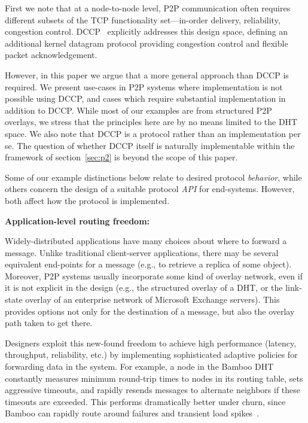 \documentclass[10pt,twocolumn]{article}
\renewcommand{\subsection}[1]{\vspace{10pt}\noindent\textbf{#1:}\vspace{5pt}}
\begin{document}
First we note that at a node-to-node level, P2P
communication often requires different subsets of the TCP
functionality set---in-order delivery, reliability, congestion
control. 
DCCP~\cite{dccp-problem} explicitly addresses this design space,
defining an additional kernel datagram protocol providing
congestion control and flexible packet acknowledgement. 

However, in this paper we argue that a more general approach than DCCP
is required.  We present use-cases in P2P systems where
implementation is not possible using DCCP, and cases which
require substantial implementation in addition to DCCP.   While most
of our examples are from structured P2P overlays, we stress that the
principles here are by no means limited to the DHT space. 
We also note that DCCP is a protocol rather than an
implementation per se.  The question of whether DCCP itself is
naturally implementable within the framework of section~\ref{sec:p2}
is beyond the scope of this paper.

Some of our example distinctions below relate to desired protocol
\emph{behavior}, while others concern the design of a suitable protocol
\emph{API} for end-systems.  However, both affect how the protocol is implemented.

\subsection{Application-level routing freedom}
\label{sec:routingFreedom}

Widely-distributed applications have many choices about
where to forward a message.  Unlike traditional client-server
applications, there may be several equivalent end-points for a message 
(e.g., to retrieve a replica of some object).  
Moreover, P2P systems usually incorporate some kind of overlay
network, even if it is not explicit in the
design (e.g., the structured overlay of a DHT, or the
link-state overlay of an enterprise network of Microsoft
Exchange servers).  This provides options not only for the
destination of a message, but also the overlay path taken to get
there.

Designers exploit this new-found freedom to achieve high performance
(latency, throughput, reliability, etc.) by implementing
sophisticated adaptive policies for forwarding data in the system.  For
example, a node in the Bamboo DHT~\cite{rhea_usenix_2004} constantly
measures minimum round-trip times to nodes in its routing table, sets
aggressive timeouts, and rapidly resends messages to alternate
neighbors if these timeouts are exceeded.   This performs
dramatically better under churn, since Bamboo can rapidly route 
around failures and transient load spikes~\cite{rhea_usenix_2004}. 
\end{document}
